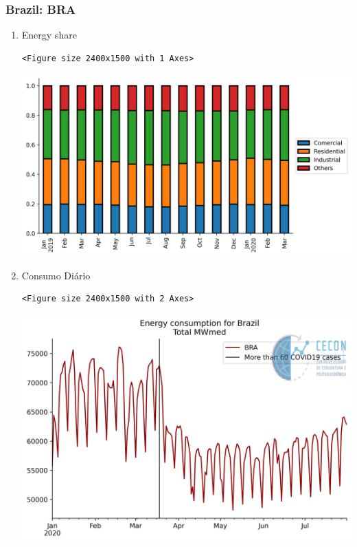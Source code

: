 \documentclass[11pt]{article}
\begin{document}
\subsubsection{Brazil: BRA}
\label{sec:org5a9297e}
\begin{enumerate}
\item Energy share
\label{sec:org5c8cb00}

\begin{verbatim}
<Figure size 2400x1500 with 1 Axes>
\end{verbatim}


\begin{center}
\includegraphics[width=.9\linewidth]{obipy-resources/62e383af79e91b63c7fc98dd7fb55b3c3ececcb9/b9bb93431770d5b32665b50dc4549f5f948c88a6.png}
\end{center}

\item Consumo Diário
\label{sec:org21c83f2}

\begin{verbatim}
<Figure size 2400x1500 with 2 Axes>
\end{verbatim}


\begin{center}
\includegraphics[width=.9\linewidth]{obipy-resources/62e383af79e91b63c7fc98dd7fb55b3c3ececcb9/77baa432ba2f44632060c841842355fcb8b83c23.png}
\end{center}


\end{enumerate}
\end{document}
